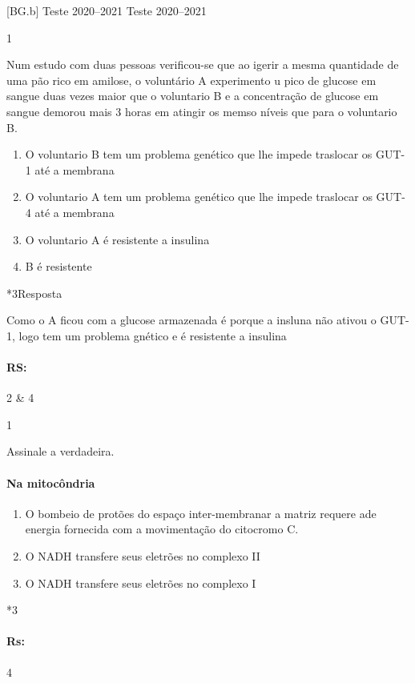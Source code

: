 \documentclass[\mainfilename]{subfiles}
\begin{document}
[BG.b]
{Teste 2020--2021}
{Teste 2020--2021}

\setcounter{question}{27}
\begin{questionBox}1{}
    
    Num estudo com duas pessoas verificou-se que ao igerir a mesma quantidade de uma pão rico em amilose, o voluntário A experimento u pico de glucose em sangue duas vezes maior que o voluntario B e a concentração de glucose em sangue demorou mais 3 horas em atingir os memso níveis que para o voluntario B.

    \begin{enumerate}
        \item O voluntario B tem um problema genético que lhe impede traslocar os GUT-1 até a membrana
        \item O voluntario A tem um problema genético que lhe impede traslocar os GUT-4 até a membrana
        \item O voluntario A é resistente a insulina
        \item B é resistente
    \end{enumerate}

    \begin{sectionBox}*3{Resposta}
        
        Como o A ficou com a glucose armazenada é porque a insluna não ativou o GUT-1, logo tem um problema gnético e é resistente a insulina

        \paragraph{RS:} 2 \& 4
        
    \end{sectionBox}
    
\end{questionBox}

\begin{questionBox}1{}
    
    Assinale a verdadeira. 
    \paragraph{Na mitocôndria}
    \begin{enumerate}
        \item O bombeio de protões do espaço inter-membranar a matriz requere ade energia fornecida com a movimentação do citocromo C.
        \item O NADH transfere seus eletrões no complexo II
        \item O NADH transfere seus eletrões no complexo I
    \end{enumerate}

    \begin{questionBox}*3{}
        
        \paragraph{Rs:} 4
        
    \end{questionBox}
    
\end{questionBox}
\end{document}
